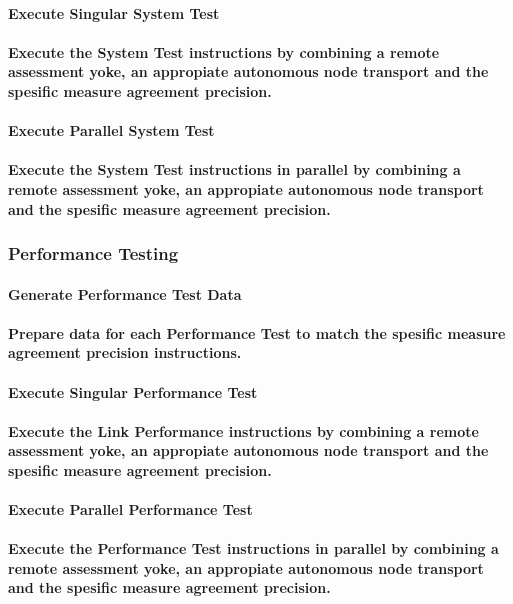 \documentclass{acm_proc_article-sp}
\begin{document}
\paragraph{Execute Singular System Test}
\paragraph{Execute the System Test instructions by combining a remote assessment yoke, an appropiate autonomous node transport and the spesific measure agreement precision.}
\paragraph{Execute Parallel System Test}
\paragraph{Execute the System Test instructions in parallel by combining a remote assessment yoke, an appropiate autonomous node transport and the spesific measure agreement precision.}
\subsubsection{Performance Testing}
\paragraph{Generate Performance Test Data}
\paragraph{Prepare data for each Performance Test to match the spesific measure agreement precision instructions.}
\paragraph{Execute Singular Performance Test}
\paragraph{Execute the Link Performance instructions by combining a remote assessment yoke, an appropiate autonomous node transport and the spesific measure agreement precision.}
\paragraph{Execute Parallel Performance Test}
\paragraph{Execute the Performance Test instructions in parallel by combining a remote assessment yoke, an appropiate autonomous node transport and the spesific measure agreement precision.}
\end{document}

